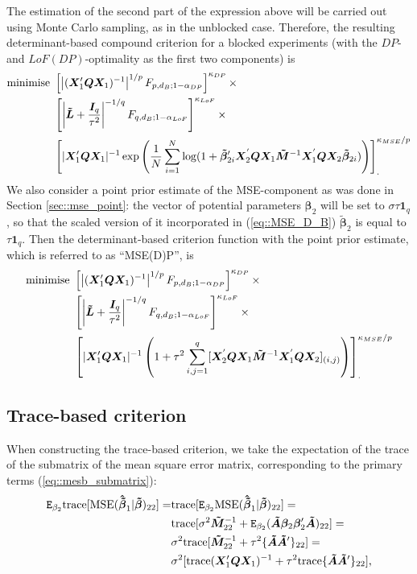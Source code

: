 The estimation of the second part of the expression above will be carried out using Monte Carlo sampling, as in the unblocked case. Therefore, the resulting determinant-based compound criterion for a blocked experiments (with the $DP$- and $LoF(DP)$-optimality as the first two components) is
\begin{align}
\label{eq::MSE_D_B}
\mbox{minimise }&\left[\left|(\bm{X}'_{1}\bm{Q}\bm{X}_{1})^{-1}\right|^{1/p}F_{p,d_B;1-\alpha_{DP}}\right]^{\kappa_{DP}} \times \notag \\ &\left[\left|\bm{\tilde{L}}+\frac{\bm{I}_{q}}{\tau^{2}}\right|^{-1/q}F_{q,d_B;1-\alpha_{LoF}}\right]^{\kappa_{LoF}}\times \notag\\ & \left[|\bm{X}'_{1}\bm{QX}_{1}|^{-1}\exp\left(\frac{1}{N}\sum_{i=1}^{N}\log(1+\bm{\tilde{\beta}}_{2i}'\bm{X}_2^{'}\bm{QX}_1\bm{\tilde{M}}^{-1}\bm{X}_1^{'}\bm{QX}_2\bm{\tilde{\beta}}_{2i})\right)\right]_{.}^{\kappa_{MSE}/p}
\end{align}
We also consider a point prior estimate of the MSE-component as was done in Section \ref{sec::mse_point}: the vector of potential parameters $\bm{\beta}_2$ will be set to $\sigma\tau\bm{1}_q$, so that the scaled version of it incorporated in (\ref{eq::MSE_D_B}) $\bm{\tilde{\beta}}_2$ is equal to $\tau\bm{1}_q$. Then the determinant-based criterion function with the point prior estimate, which is referred to as ``MSE(D)P'', is  
\begin{align}
\label{eq::MSE_DP_B}
\mbox{minimise }&\left[\left|(\bm{X}'_{1}\bm{Q}\bm{X}_{1})^{-1}\right|^{1/p}F_{p,d_B;1-\alpha_{DP}}\right]^{\kappa_{DP}} \times \notag \\ &\left[\left|\bm{\tilde{L}}+\frac{\bm{I}_{q}}{\tau^{2}}\right|^{-1/q}F_{q,d_B;1-\alpha_{LoF}}\right]^{\kappa_{LoF}}\times \notag\\ & \left[|\bm{X}'_{1}\bm{QX}_{1}|^{-1}\left(1+\tau^2\sum_{i,j=1}^{q}[\bm{X}_2^{'}\bm{QX}_1\bm{\tilde{M}}^{-1}\bm{X}_1^{'}\bm{QX}_2]_{(i,j)}\right)\right]_{.}^{\kappa_{MSE}/p}
\end{align}

\subsection{Trace-based criterion}

When constructing the trace-based criterion, we take the expectation of the trace of the submatrix of the mean square error matrix, corresponding to the primary terms (\ref{eq::mesb_submatrix}):
\begin{align}
\label{eq::MSE_B_tr}
\mathtt{E}_{\beta_2}\mbox{trace}[\mbox{MSE}(\bm{\hat{\tilde{\beta}}}_1|\bm{\tilde{\beta}})_{22}]=& \mbox{trace}[\mathtt{E}_{\beta_2}\mbox{MSE}(\bm{\hat{\tilde{\beta}}}_1|\bm{\tilde{\beta}})_{22}]=\notag\\&\mbox{trace}[\sigma^2\bm{\tilde{M}}^{-1}_{22}+\mathtt{E}_{\beta_2}(\bm{\tilde{A}}\bm{\beta}_2\bm{\beta}_2'\bm{\tilde{A}})_{22}]=\notag \\& \sigma^2\mbox{trace}[\bm{\tilde{M}}^{-1}_{22}+\tau^2\{\bm{\tilde{A}}\bm{\tilde{A}}'\}_{22}]=\notag \\&\sigma^2[\mbox{trace}(\bm{X}'_{1}\bm{QX}_{1})^{-1}+\tau^2\mbox{trace}\{\bm{\tilde{A}}\bm{\tilde{A}}'\}_{22}],
\end{align}

